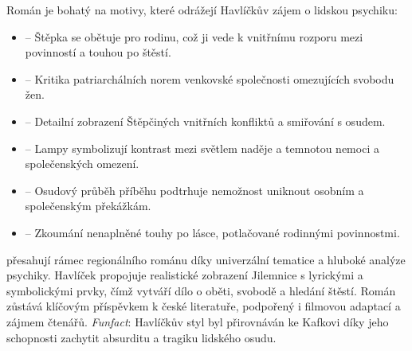 \documentclass{article}
\begin{document}
\begin{mdframed}[backgroundcolor=DP,
	linecolor=cyan,
	linewidth=2pt,
	innertopmargin=5pt,
	innerbottommargin=5pt,
	innerleftmargin=5pt,
	innerrightmargin=5pt]\color{white}
\par
Román  je bohatý na motivy, které odrážejí Havlíčkův zájem o lidskou psychiku:
\begin{itemize}[leftmargin=*]\setlength\itemsep{-4pt}
	\item {} -- Štěpka se obětuje pro rodinu, což ji vede k vnitřnímu rozporu mezi povinností a touhou po štěstí.
	\item {} -- Kritika patriarchálních norem venkovské společnosti omezujících svobodu žen.
	\item {} -- Detailní zobrazení Štěpčiných vnitřních konfliktů a smiřování s osudem.
	\item {} -- Lampy symbolizují kontrast mezi světlem naděje a temnotou nemoci a společenských omezení.
	\item {} -- Osudový průběh příběhu podtrhuje nemožnost uniknout osobním a společenským překážkám.
	\item {} -- Zkoumání nenaplněné touhy po lásce, potlačované rodinnými povinnostmi.
\end{itemize}
\end{mdframed}\vspace{-2pt}
	
\begin{mdframed}[backgroundcolor=DP,
	linecolor=cyan,
	linewidth=2pt,
	innertopmargin=5pt,
	innerbottommargin=5pt,
	innerleftmargin=5pt,
	innerrightmargin=5pt]\color{white}
\par
{} přesahují rámec regionálního románu díky univerzální tematice a hluboké analýze psychiky. Havlíček propojuje realistické zobrazení Jilemnice s lyrickými a symbolickými prvky, čímž vytváří dílo o oběti, svobodě a hledání štěstí. Román zůstává klíčovým příspěvkem k české literatuře, podpořený i filmovou adaptací a zájmem čtenářů. \textit{Funfact}: Havlíčkův styl byl přirovnáván ke Kafkovi díky jeho schopnosti zachytit absurditu a tragiku lidského osudu.
\end{mdframed}\vspace{-2pt}
\end{document}
